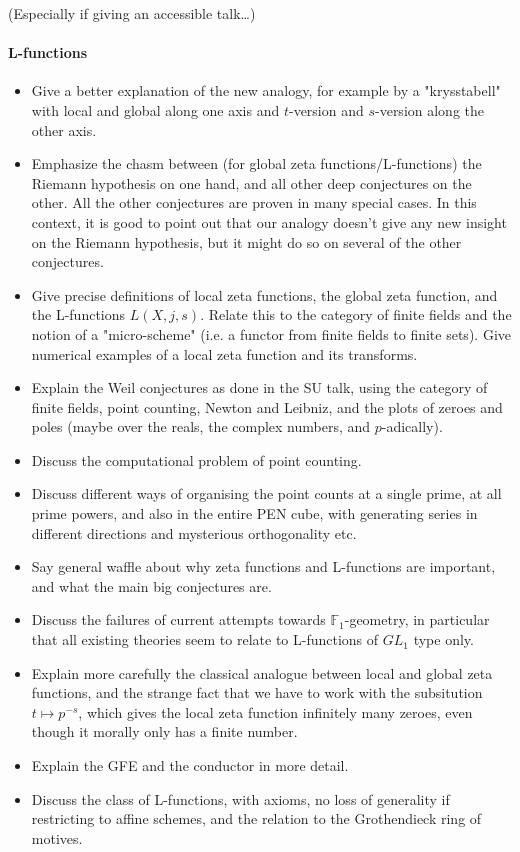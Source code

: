 \documentclass[paper=a4, fontsize=11pt]{scrartcl} %
\numberwithin{equation}{section} %
\numberwithin{figure}{section} %
\numberwithin{table}{section} %
\begin{document}
(Especially if giving an accessible talk\ldots)
\paragraph{L-functions}

\begin{itemize}
\item Give a better explanation of the new analogy, for example by a "krysstabell" with local and global along one axis and $t$-version and $s$-version along the other axis.
\item Emphasize the chasm between (for global zeta functions/L-functions) the Riemann hypothesis on one hand, and all other deep conjectures on the other. All the other conjectures are proven in many special cases. In this context, it is good to point out that our analogy doesn't give any new insight on the Riemann hypothesis, but it might do so on several of the other conjectures.
\item Give precise definitions of local zeta functions, the global zeta function, and the L-functions $L(X, j, s)$. Relate this to the category of finite fields and the notion of a "micro-scheme" (i.e. a functor from finite fields to finite sets). Give numerical examples of a local zeta function and its transforms.
\item Explain the Weil conjectures as done in the SU talk, using the category of finite fields, point counting, Newton and Leibniz, and the plots of zeroes and poles (maybe over the reals, the complex numbers, and $p$-adically).
\item Discuss the computational problem of point counting.
\item Discuss different ways of organising the point counts at a single prime, at all prime powers, and also in the entire PEN cube, with generating series in different directions and mysterious orthogonality etc.
\item Say general waffle about why zeta functions and L-functions are important, and what the main big conjectures are.
\item Discuss the failures of current attempts towards $\mathbb{F}_1$-geometry, in particular that all existing theories seem to relate to L-functions of $GL_1$ type only.
\item Explain more carefully the classical analogue between local and global zeta functions, and the strange fact that we have to work with the subsitution $t \mapsto p^{-s}$, which gives the local zeta function infinitely many zeroes, even though it morally only has a finite number.
\item Explain the GFE and the conductor in more detail.
\item Discuss the class of L-functions, with axioms, no loss of generality if restricting to affine schemes, and the relation to the Grothendieck ring of motives.
\end{itemize}
\end{document}

